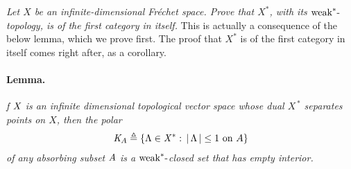 \textit{\noindent
Let $X$ be an infinite-dimensional Fréchet space. %
Prove that $X^\ast$, with its $\text{weak}^\ast\text{-}$topology, %
is of the first category in itself.
}
\newline\newline\noindent
This is actually a consequence of the below lemma,  %
which we prove first. %
The proof that $X^\ast$ is of the first category in itself comes right after, %
as a corollary.%
%
\paragraph{Lemma.}{\it %
f $\mathit{X}$ is an infinite dimensional topological vector space whose dual %
%
  $\mathit{X^{\,\ast}}$ %
%
separates points on $X$, then the polar
%
  \begin{align}
    \mathit{K}_A\triangleq \{ \Lambda \in \mathit{X^\ast}:\, \left\lvert\, \Lambda \,\right\rvert \leq \mathrm{1} \text{ on } A\}
  \end{align} 
%
of any absorbing subset $\mathit{A}$ is a $\mathit{\text{weak}^\ast\text{-}}$closed set that has empty interior.
}
%
